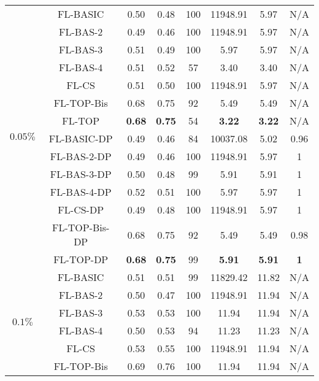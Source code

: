 \documentclass[accepted]{uai2021} %
\begin{document}
\begin{table*}[!ht]
{\begin{tabular}{|c|c|c|c|c|c|c|c|}
        \multirow{14}{*}{$0.05\%$} &  FL-BASIC  & 0.50 & 0.48 & 100 & 11948.91 & 5.97 & N/A \\
        \cline{2-8}
        &  FL-BAS-2  & 0.49 & 0.46 & 100 & 11948.91 & 5.97 & N/A  \\
        \cline{2-8}
        &  FL-BAS-3 &  0.51 & 0.49 & 100 & 5.97 & 5.97 & N/A \\
        \cline{2-8}
        &  FL-BAS-4 &  0.51  & 0.52 & 57 & 3.40 & 3.40 &N/A \\
        \cline{2-8}
        &  FL-CS &  0.51  & 0.50 & 100 & 11948.91 & 5.97 & N/A \\
        \cline{2-8}
        &  FL-TOP-Bis &  0.68  & 0.75 & 92 & 5.49 & 5.49 & N/A \\
        \cline{2-8}
        &  FL-TOP & \textbf{0.68}  & \textbf{0.75} & 54 & \textbf{3.22} & \textbf{3.22} &N/A \\
        \cline{2-8}
        &  FL-BASIC-DP  & 0.49 & 0.46 & 84 & 10037.08 & 5.02 & 0.96  \\
        \cline{2-8}
        &  FL-BAS-2-DP  & 0.49 & 0.46 & 100 & 11948.91 & 5.97 & 1 \\
        \cline{2-8}
        &  FL-BAS-3-DP &  0.50  & 0.48 & 99 & 5.91 & 5.91 & 1\\
        \cline{2-8}
        &  FL-BAS-4-DP &  0.52  & 0.51 & 100 & 5.97 & 5.97 & 1\\
        \cline{2-8}
        &  FL-CS-DP &  0.49  & 0.48 & 100 & 11948.91 & 5.97 & 1\\
        \cline{2-8}
        &  FL-TOP-Bis-DP &  0.68  & 0.75 & 92 & 5.49 & 5.49  & 0.98\\
        \cline{2-8}
        &  FL-TOP-DP &  \textbf{0.68}  & \textbf{0.75} & 99 & \textbf{5.91} & \textbf{5.91} & \textbf{1}\\
        \hline 
        \hline
        \multirow{14}{*}{$0.1\%$} &  FL-BASIC  & 0.51 & 0.51 & 99 & 11829.42 & 11.82 & N/A \\
        \cline{2-8}
        &  FL-BAS-2  & 0.50 & 0.47 & 100 & 11948.91 & 11.94 &N/A  \\
        \cline{2-8}
        &  FL-BAS-3 &  0.53  & 0.53 & 100 & 11.94 & 11.94 &N/A \\
        \cline{2-8}
        &  FL-BAS-4 &  0.50  & 0.53 & 94 & 11.23 & 11.23 &N/A \\
        \cline{2-8}
        &  FL-CS &  0.53  & 0.55 & 100 & 11948.91 & 11.94 &N/A \\
        \cline{2-8}
        &  FL-TOP-Bis &  0.69  & 0.76 & 100 & 11.94 & 11.94 &N/A \\

\end{tabular}}
\end{table*}
\end{document}
